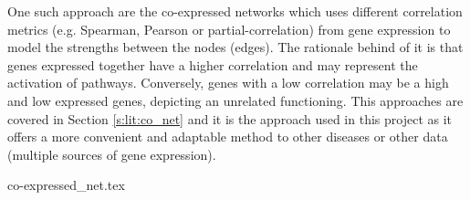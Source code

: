 One such approach are the co-expressed networks which uses different correlation metrics (e.g. Spearman, Pearson or partial-correlation) from gene expression to model the strengths between the nodes (edges). The rationale behind of it is that genes expressed together have a higher correlation and may represent the activation of pathways. Conversely, genes with a low correlation may be a high and low expressed genes, depicting an unrelated functioning. This approaches are covered in Section \ref{s:lit:co_net} and it is the approach used in this project as it offers a more convenient and adaptable method to other diseases or other data (multiple sources of gene expression).

{co-expressed_net.tex}
